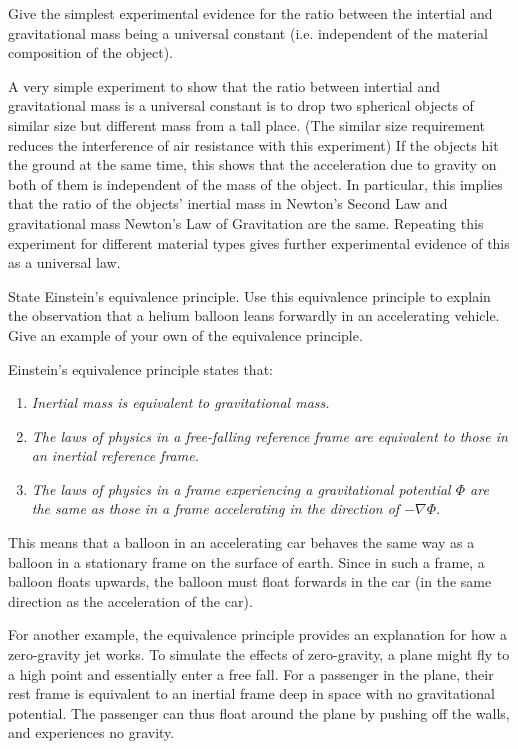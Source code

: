 \documentclass{../../templates/lkx_pset}
\begin{document}
\begin{problem}{6}
Give the simplest experimental evidence for the ratio between the intertial and gravitational mass being a universal constant (i.e. independent of the material composition of the object).
\end{problem}
\begin{solution}
	A very simple experiment to show that the ratio between intertial and gravitational mass is a universal constant is to drop two spherical objects of similar size but different mass from a tall place. (The similar size requirement reduces the interference of air resistance with this experiment) If the objects hit the ground at the same time, this shows that the acceleration due to gravity on both of them is independent of the mass of the object. In particular, this implies that the ratio of the objects' inertial mass in Newton's Second Law and gravitational mass Newton's Law of Gravitation are the same. Repeating this experiment for different material types gives further experimental evidence of this as a universal law.
\end{solution}

\begin{problem}{7}
State Einstein's equivalence principle. Use this equivalence principle to explain the observation that a helium balloon leans forwardly in an accelerating vehicle. Give an example of your own of the equivalence principle.
\end{problem}
\begin{solution}
	Einstein's equivalence principle states that:
	\begin{enumerate}
		\item \emph{Inertial mass is equivalent to gravitational mass.}
		\item \emph{The laws of physics in a free-falling reference frame are equivalent to those in an inertial reference frame.}
		\item \emph{The laws of physics in a frame experiencing a gravitational potential $\Phi$ are the same as those in a frame accelerating in the direction of $-\nabla\Phi$.}
	\end{enumerate}
	This means that a balloon in an accelerating car behaves the same way as a balloon in a stationary frame on the surface of earth. Since in such a frame, a balloon floats upwards, the balloon must float forwards in the car (in the same direction as the acceleration of the car).

	For another example, the equivalence principle provides an explanation for how a zero-gravity jet works. To simulate the effects of zero-gravity, a plane might fly to a high point and essentially enter a free fall. For a passenger in the plane, their rest frame is equivalent to an inertial frame deep in space with no gravitational potential. The passenger can thus float around the plane by pushing off the walls, and experiences no gravity.
\end{solution}
\end{document}
